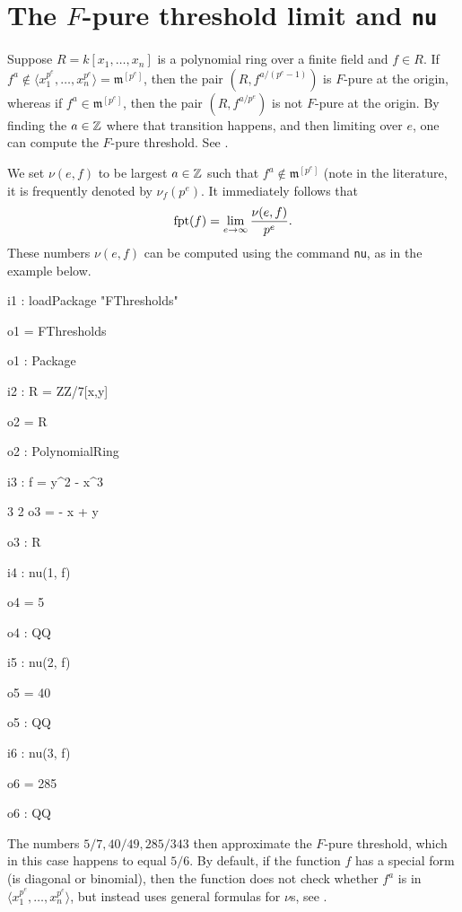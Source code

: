 \documentclass{amsart}
\newcommand{\fram}{\mathfrak{m}}
\begin{document}
\section{The $F$-pure threshold limit and {\tt nu}}
\label{sec.Nu}

Suppose $R = k[x_1, \dots, x_n]$ is a polynomial ring over a finite field and $f \in R$.    If $f^a \notin \langle x_1^{p^e}, \dots, x_n^{p^e} \rangle = \fram^{[p^e]}$, then the pair $(R, f^{a/(p^e -1)})$ is $F$-pure at the origin, whereas if $f^a \in \fram^{[p^e]}$, then the pair $(R, f^{a/p^e})$ is not $F$-pure at the origin.  By finding the $a \in \mathbb{Z}$ where that transition happens, and then limiting over $e$, one can compute the $F$-pure threshold.  See \cite{MustataTakagiWatanabeFThresholdsAndBernsteinSato}.

We set $\nu(e, f)$ to be largest $a \in \mathbb{Z}$ such that $f^a \notin \fram^{[p^e]}$ (note in the literature, it is frequently denoted by $\nu_f(p^e)$.  It immediately follows that
\[
\operatorname{{fpt}}(f) = \lim_{e \to \infty} {\nu(e, f) \over p^e}.
\]
These numbers $\nu(e, f)$ can be computed using the command {\tt nu}, as in the example below.
\medskip
{\small
{}
\begin{MyVerbatim}
i1 : loadPackage "FThresholds"

o1 = FThresholds

o1 : Package

i2 : R = ZZ/7[x,y]

o2 = R

o2 : PolynomialRing

i3 : f = y^2 - x^3

        3    2
o3 = - x  + y

o3 : R

i4 : nu(1, f)

o4 = 5

o4 : QQ

i5 : nu(2, f)

o5 = 40

o5 : QQ

i6 : nu(3, f)

o6 = 285

o6 : QQ
\end{MyVerbatim}
}
\medskip
The numbers $5/7, 40/49, 285/343$ then approximate the $F$-pure threshold, which in this case happens to equal $5/6$.  By default, if the function $f$ has a special form (is diagonal or binomial), then the function does not check whether $f^a$ is in  $\langle x_1^{p^e}, \dots, x_n^{p^e} \rangle$, but instead uses general formulas for $\nu$s, see \cite{HernandezFPureThresholdOfBinomial,HernandezFInvariantsOfDiagonalHyp}.
\end{document}
